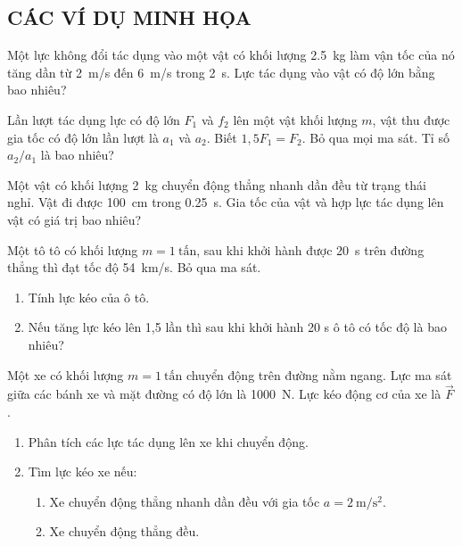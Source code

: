 \subsection{CÁC VÍ DỤ MINH HỌA}
\setcounter{ex}{0}
\begin{ex}
	Một lực không đổi tác dụng vào một vật có khối lượng \SI{2.5}{\kilogram} làm vận tốc của nó tăng dần từ \SI{2}{\meter/\second} đến \SI{6}{\meter/\second} trong \SI{2}{\second}. Lực tác dụng vào vật có độ lớn bằng bao nhiêu?
	\loigiai{}
\end{ex}
\begin{ex}
	Lần lượt tác dụng lực có độ lớn $F_1$ và $f_2$ lên một vật khối lượng $m$, vật thu được gia tốc có độ lớn lần lượt là $a_1$ và $a_2$. Biết $1,5F_1=F_2$. Bỏ qua mọi ma sát. Tỉ số $a_2/a_1$ là bao nhiêu?
	\loigiai{}
\end{ex}
\begin{ex}
	Một vật có khối lượng \SI{2}{\kilogram} chuyển động thẳng nhanh dần đều từ trạng thái nghỉ. Vật đi được \SI{100}{\centi\meter} trong \SI{0.25}{\second}. Gia tốc của vật và hợp lực tác dụng lên vật có giá trị bao nhiêu?
	\loigiai{}
\end{ex}
\begin{ex}
	Một tô tô có khối lượng $m =\SI{1}{\text{tấn}}$, sau khi khởi hành được \SI{20}{\second} trên đường thẳng thì đạt tốc độ \SI{54}{\kilo\meter/\second}. Bỏ qua ma sát.
	\begin{enumerate}[label=\alph*)]
		\item Tính lực kéo của ô tô.
		\item Nếu tăng lực kéo lên 1,5 lần thì sau khi khởi hành 20 s ô tô có tốc độ là bao nhiêu?
	\end{enumerate}
	\loigiai{}
\end{ex}
\begin{ex}
	Một xe có khối lượng $m = \SI{1}{\text{tấn}} $ chuyển động trên đường nằm ngang. Lực ma sát giữa các bánh xe và mặt đường có độ lớn là \SI{1000}{\newton}. Lực kéo động cơ của xe là $\vec{F}$.
	\begin{enumerate}[label=\alph*)]
		\item Phân tích các lực tác dụng lên xe khi chuyển động.
		\item Tìm lực kéo xe nếu:
		\begin{enumerate}[label=\arabic*.]
			\item Xe chuyển động thẳng nhanh dần đều với gia tốc $a=\SI{2}{\meter/\second^2}$.
			\item Xe chuyển động thẳng đều.
		\end{enumerate}
	\end{enumerate}
	\loigiai{}
\end{ex}
